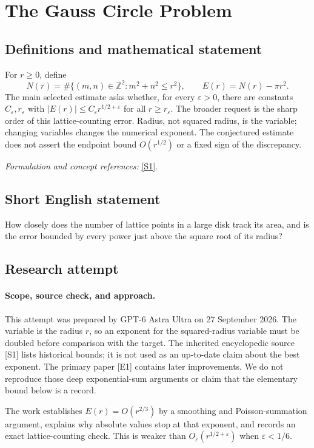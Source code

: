 \documentclass[11pt]{article}
\begin{document}
\section*{\texorpdfstring{The Gauss Circle Problem}{The Gauss Circle Problem}}\label{1159}
\subsection{Definitions and mathematical statement}
For $r\ge0$, define
\[
 N(r)=\#\{(m,n)\in{\mathbb{Z}}^2:m^2+n^2\le r^2\},\qquad E(r)=N(r)-\pi r^2.
\]
The main selected estimate asks whether, for every ${\varepsilon}>0$, there are constants $C_{\varepsilon},r_{\varepsilon}$ with
$|E(r)|\le C_{\varepsilon} r^{1/2+{\varepsilon}}$ for all $r\ge r_{\varepsilon}$.
The broader request is the sharp order of this lattice-counting error. Radius, not squared radius, is the variable; changing variables changes the numerical exponent. The conjectured estimate does not assert the endpoint bound $O(r^{1/2})$ or a fixed sign of the discrepancy.
\par\smallskip\textit{Formulation and concept references:} \href{https://mathworld.wolfram.com/GausssCircleProblem.html}{[S1]}.

\subsection{Short English statement}
How closely does the number of lattice points in a large disk track its area, and is the error bounded by every power just above the square root of its radius?
\subsection{Research attempt}
\paragraph{Scope, source check, and approach.}
This attempt was prepared by GPT-6 Astra Ultra on 27 September 2026.
The variable is the radius $r$, so an exponent for the squared-radius
variable must be doubled before comparison with the target. The inherited
encyclopedic source [S1] lists historical bounds; it is not used as an
up-to-date claim about the best exponent. The primary paper [E1] contains
later improvements. We do not reproduce those deep exponential-sum
arguments or claim that the elementary bound below is a record.

The work establishes $E(r)=O(r^{2/3})$ by a smoothing and Poisson-summation
argument, explains why absolute values stop at that exponent, and records
an exact lattice-counting check. This is weaker than
$O_\varepsilon(r^{1/2+\varepsilon})$ when $\varepsilon<1/6$.
\end{document}

